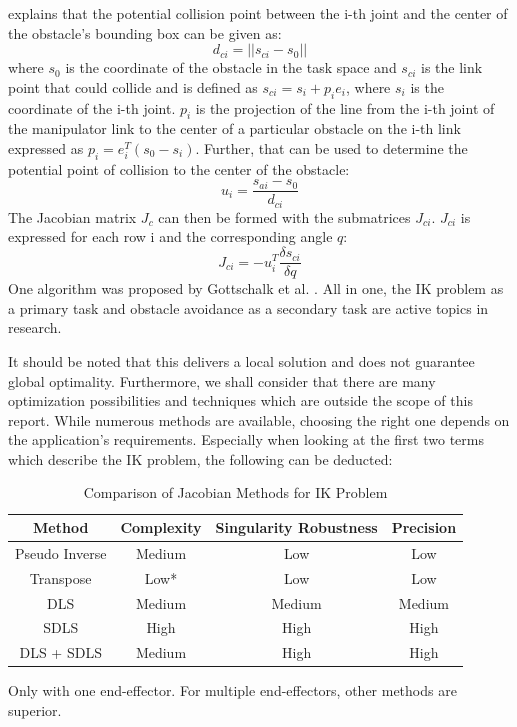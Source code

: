 \documentclass[conference]{IEEEtran}
\begin{document}
\cite{chembuly_efficient_2020} explains that the potential collision point between the i-th joint and the center of the obstacle's bounding box can be given as:
\begin{equation}
    d_{ci} = ||s_{ci} - s_0||
\end{equation}
where $s_0$ is the coordinate of the obstacle in the task space and $s_{ci}$ is the link point that could collide and is defined as $s_{ci}= s_i + p_ie_i$, where $s_i$ is the coordinate of the i-th joint. $p_i$ is the projection of the line from the i-th joint of the manipulator link to the center of a particular obstacle on the i-th link expressed as $p_i = e_i^T(s_0-s_i)$.
Further, that can be used to determine the potential point of collision to the center of the obstacle:
\begin{equation}
    u_{i} = \frac{s_{ai}-s_0}{d_{ci}}
\end{equation}
The Jacobian matrix $J_c$ can then be formed with the submatrices $J_{ci}$. $J_{ci}$ is expressed for each row i and the corresponding angle $q$:
\begin{equation}
    J_{ci} = -u_i^T\frac{\delta s_{ci}}{\delta q}
\end{equation}
One algorithm was proposed by Gottschalk et al. \cite{gottschalk_obbtree_1996}. All in one, the IK problem as a primary task and obstacle avoidance as a secondary task are active topics in research.

It should be noted that this delivers a local solution and does not guarantee global optimality. Furthermore, we shall consider that there are many optimization possibilities and techniques \cite{zhao_inverse_1994}\cite{uicker_iterative_1964}\cite{kelemen_novel_2018} which are outside the scope of this report. While numerous methods are available, choosing the right one depends on the application's requirements. Especially when looking at the first two terms which describe the IK problem, the following can be deducted:

\begin{table}[ht]
\centering
\begin{threeparttable}
\caption{Comparison of Jacobian Methods for IK Problem} \label{Jacobian Methods Comparison Table}
\begin{tabular}{|c|c|c|c|}
\hline
\textbf{Method} & \textbf{Complexity} & \textbf{Singularity Robustness} & \textbf{Precision}\\
\hline
Pseudo Inverse & Medium & Low & Low  \\
Transpose & Low* & Low & Low \\
DLS & Medium & Medium & Medium \\
SDLS & High & High & High \\
DLS + SDLS & Medium & High & High \\
\hline
\end{tabular}
\begin{tablenotes}\footnotesize
\item[*] Only with one end-effector. For multiple end-effectors, other methods are superior.
\end{tablenotes}
\end{threeparttable}
\end{table}
\end{document}
